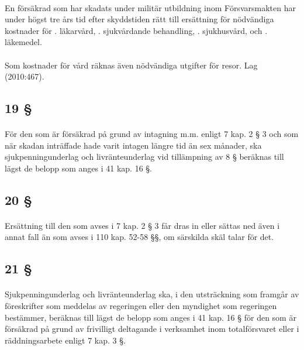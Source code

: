 \documentclass[a4paper,notitlepage,openany,10pt]{book}
\begin{document}
\paragraph*{}
En försäkrad som har skadats under militär utbildning inom Försvarsmakten har under högst tre års tid efter skyddstiden rätt till ersättning för nödvändiga kostnader för
. läkarvård,
. sjukvårdande behandling,
. sjukhusvård, och
. läkemedel.
\paragraph*{}
Som kostnader för vård räknas även nödvändiga utgifter för resor.
Lag (2010:467).
\subsection*{19 §}
\paragraph*{}
För den som är försäkrad på grund av intagning m.m.
enligt 7 kap. 2 § 3 och som när skadan inträffade hade varit intagen längre tid än sex månader, ska sjukpenningunderlag och livränteunderlag vid tillämpning av 8 § beräknas till lägst de belopp som anges i 41 kap. 16 §.
\subsection*{20 §}
\paragraph*{}
Ersättning till den som avses i 7 kap. 2 § 3 får dras in eller sättas ned även i annat fall än som avses i 110 kap. 52-58 §§, om särskilda skäl talar för det.
\subsection*{21 §}
\paragraph*{}
Sjukpenningunderlag och livränteunderlag ska, i den utsträckning som framgår av föreskrifter som meddelas av regeringen eller den myndighet som regeringen bestämmer, beräknas till lägst de belopp som anges i 41 kap. 16 § för den som är försäkrad på grund av frivilligt deltagande i verksamhet inom totalförsvaret eller i räddningsarbete enligt 7 kap. 3 §.
\end{document}
